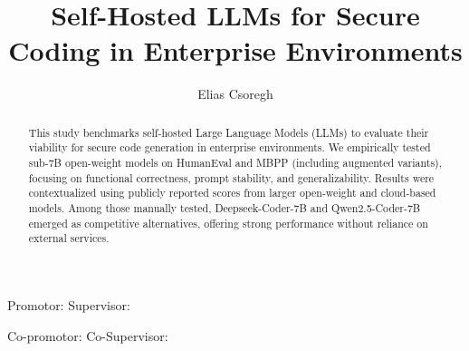 \documentclass[a0,portrait,english]{hogent-poster}
\title{Self-Hosted LLMs for Secure Coding in Enterprise Environments}
\author{Elias Csoregh}
\begin{document}
\makeatletter
\patchcmd{\@maketitle}
{Promotor:}
{Supervisor:}
{}{}

\patchcmd{\@maketitle}
{Co-promotor:}
{Co-Supervisor:}
{}{}
\makeatother

\maketitle

\begin{abstract}
	This study benchmarks self-hosted Large Language Models (LLMs) to evaluate their viability for secure code generation in enterprise environments. We empirically tested sub-7B open-weight models on HumanEval and MBPP (including augmented variants), focusing on functional correctness, prompt stability, and generalizability. Results were contextualized using publicly reported scores from larger open-weight and cloud-based models. Among those manually tested, Deepseek-Coder-7B and Qwen2.5-Coder-7B emerged as competitive alternatives, offering strong performance without reliance on external services.
\end{abstract}
\end{document}
